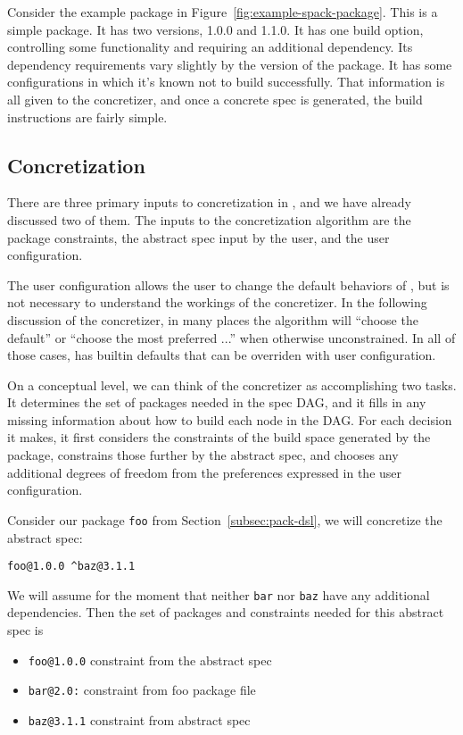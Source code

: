 Consider the example package in Figure~\ref{fig:example-spack-package}. This is a simple package. It has two versions, 1.0.0 and 1.1.0. It has one build option, controlling some functionality and requiring an additional dependency. Its dependency requirements vary slightly by the version of the package. It has some configurations in which it's known not to build successfully. That information is all given to the concretizer, and once a concrete spec is generated, the build instructions are fairly simple.

\subsection{Concretization}

There are three primary inputs to concretization in \spack{}, and we have already discussed two of them. The inputs to the concretization algorithm are the package constraints, the abstract spec input by the user, and the user configuration.

The user configuration allows the user to change the default behaviors of \spack{}, but is not necessary to understand the workings of the concretizer. In the following discussion of the concretizer, in many places the algorithm will ``choose the default'' or ``choose the most preferred ...'' when otherwise unconstrained. In all of those cases, \spack{} has builtin defaults that can be overriden with user configuration.

On a conceptual level, we can think of the concretizer as accomplishing two tasks. It determines the set of packages needed in the spec DAG, and it fills in any missing information about how to build each node in the DAG. For each decision it makes, it first considers the constraints of the build space generated by the package, constrains those further by the abstract spec, and chooses any additional degrees of freedom from the preferences expressed in the user configuration.

Consider our package \texttt{foo} from Section~\ref{subsec:pack-dsl}, we will concretize the abstract spec:
\begin{verbatim}
foo@1.0.0 ^baz@3.1.1
\end{verbatim}
We will assume for the moment that neither \texttt{bar} nor \texttt{baz} have any additional dependencies. Then the set of packages and constraints needed for this abstract spec is

\begin{itemize}
\item \texttt{foo@1.0.0} constraint from the abstract spec \\
\item \texttt{bar@2.0:} constraint from foo package file \\
\item \texttt{baz@3.1.1} constraint from abstract spec \\
\end{itemize}

